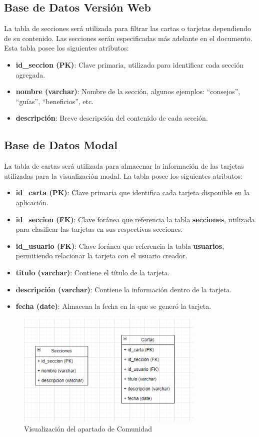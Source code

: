 \documentclass[11pt, a4paper, oneside]{book}
\begin{document}
\subsection{Base de Datos Versión Web}
La tabla de secciones será utilizada para filtrar las cartas o tarjetas dependiendo de su contenido. Las secciones serán especificadas más adelante en el documento. Esta tabla posee los siguientes atributos:

\begin{itemize}
    \item \textbf{id\_seccion (PK)}: Clave primaria, utilizada para identificar cada sección agregada.
    \item \textbf{nombre (varchar)}: Nombre de la sección, algunos ejemplos: “consejos”, “guías”, “beneficios”, etc.
    \item \textbf{descripción}: Breve descripción del contenido de cada sección.
\end{itemize}

\subsection{Base de Datos Modal}
La tabla de cartas será utilizada para almacenar la información de las tarjetas utilizadas para la visualización modal. La tabla posee los siguientes atributos:

\begin{itemize}
    \item \textbf{id\_carta (PK)}: Clave primaria que identifica cada tarjeta disponible en la aplicación.
    \item \textbf{id\_seccion (FK)}: Clave foránea que referencia la tabla \textbf{secciones}, utilizada para clasificar las tarjetas en sus respectivas secciones.
    \item \textbf{id\_usuario (FK)}: Clave foránea que referencia la tabla \textbf{usuarios}, permitiendo relacionar la tarjeta con el usuario creador.
    \item \textbf{titulo (varchar)}: Contiene el título de la tarjeta.
    \item \textbf{descripción (varchar)}: Contiene la información dentro de la tarjeta.
    \item \textbf{fecha (date)}: Almacena la fecha en la que se generó la tarjeta.
\end{itemize}


\begin{figure}[H]
\centering
\includegraphics[width=0.8\textwidth]{Pictures/bd5.png}
\caption{Visualización del apartado de Comunidad}
\end{figure}
\end{document}

